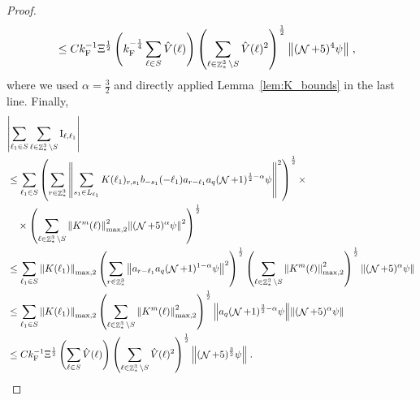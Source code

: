 \documentclass[sn-mathphys, Numbered ,a4paper]{sn-jnl}%
\DeclareMathOperator{\Z}{\mathbb{Z}}
\DeclareMathOperator{\NN}{\mathcal{N}}
\newcommand{\F}{\mathrm{F}}
\newcommand{\I}{\mathrm{I}}
\theoremstyle{plain}
\theoremstyle{definition}
\theoremstyle{remark}
\theoremstyle{plain}
\theoremstyle{definition}
\theoremstyle{remark}
\begin{document}
\begin{proof}
\begin{align}
    	&\leq C k_{\F}^{-1} \Xi^{\frac 12}
    		\left( k_{\F}^{-\frac 14} \sum_{\ell \in S} \hat{V}(\ell) \right)
    		\left( \sum_{\ell \in \Z^3_* \setminus S} \hat{V}(\ell)^2 \right)^{\frac 12}
    		\norm{(\NN+5)^4 \psi} \;,
\end{align}
where we used $ \alpha = \frac 32 $ and directly applied Lemma~\ref{lem:K_bounds} in the last line. Finally,
\begin{align}
	&\abs{\sum_{\ell_1 \in S} \sum_{\ell \in \Z^3_* \setminus S} \I_{\ell,\ell_1}} \nonumber\\
	&\leq \sum_{\ell_1 \in S} \left( \sum_{r \in \Z^3_*}
    		\norm{\sum_{s_1 \in L_{\ell_1}} K(\ell_1)_{r,s_1} b_{-s_1}(-\ell_1) a_{r-\ell_1} a_q (\NN+1)^{\frac 12-\alpha} \psi}^2 \right)^{\frac 12} \times \nonumber\\
    	&\quad \times \left( \sum_{\ell \in \Z^3_* \setminus S} \norm{K^m(\ell)}_{\max,2}^2
    		\norm{ (\NN+5)^{\alpha}\psi }^2 \right)^{\frac 12} \nonumber\\
    	&\leq \sum_{\ell_1 \in S} \norm{K(\ell_1)}_{\max,2} \left( \sum_{r \in \Z^3_*}
    		\norm{ a_{r-\ell_1} a_q (\NN+1)^{1-\alpha} \psi}^2 \right)^{\frac 12} 
    		\left( \sum_{\ell \in \Z^3_* \setminus S} \norm{K^m(\ell)}_{\max,2}^2 \right)^{\frac 12}
    		\norm{ (\NN+5)^{\alpha}\psi } \nonumber\\
    	&\leq \sum_{\ell_1 \in S} \norm{K(\ell_1)}_{\max,2}
    		\left( \sum_{\ell \in \Z^3_* \setminus S} \norm{K^m(\ell)}_{\max,2}^2 \right)^{\frac 12}
    		\norm{ a_q (\NN+1)^{\frac 32-\alpha} \psi}
    		\norm{ (\NN+5)^{\alpha}\psi } \nonumber\\
    		&\leq C k_{\F}^{-1} \Xi^{\frac 12}
    		\left( \sum_{\ell \in S} \hat{V}(\ell) \right)
    		\left( \sum_{\ell \in \Z^3_* \setminus S} \hat{V}(\ell)^2 \right)^{\frac 12}
    		\norm{(\NN+5)^{\frac 32} \psi} \;.
\end{align}




\end{proof}
\end{document}

